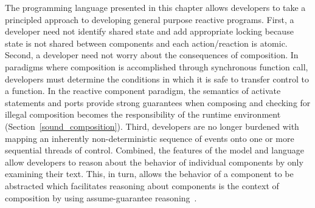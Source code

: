 The \rcgo{} programming language presented in this chapter allows developers to take a principled approach to developing general purpose reactive programs.
First, a developer need not identify shared state and add appropriate locking because state is not shared between components and each action/reaction is atomic.
Second, a developer need not worry about the consequences of composition.
In paradigms where composition is accomplished through synchronous function call, developers must determine the conditions in which it is safe to transfer control to a function.
In the reactive component paradigm, the semantics of activate statements and ports provide strong guarantees when composing and checking for illegal composition becomes the responsibility of the runtime environment (Section~\ref{sound_composition}).
Third, developers are no longer burdened with mapping an inherently non-deterministic sequence of events onto one or more sequential threads of control.
Combined, the features of the model and language allow developers to reason about the behavior of individual components by only examining their text.
This, in turn, allows the behavior of a component to be abstracted which facilitates reasoning about components is the context of composition by using assume-guarantee reasoning~\cite{Jones:1983:TST:69575.69577}.
